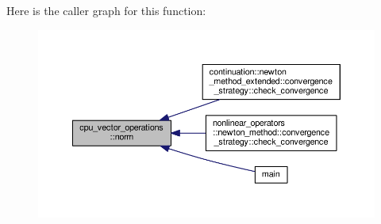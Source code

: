 Here is the caller graph for this function\-:
\nopagebreak
\begin{figure}[H]
\begin{center}
\leavevmode
\includegraphics[width=350pt]{structcpu__vector__operations_abb4a0ddd5d65ef1ae8c979e71da96ba8_icgraph}
\end{center}
\end{figure}



